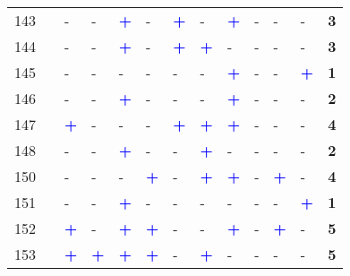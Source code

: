 \begin{longtable}{p{0.5cm}p{4.6cm}p{0.3cm}p{0.3cm}p{0.3cm}p{0.3cm}p{0.3cm}p{0.3cm}p{0.3cm}p{0.3cm}p{0.3cm}p{0.3cm}p{1cm}}
    \small{143} & \small{\textcite{meng_influence_2016}}\index{Meng, Meng|pagebf} & - & - & \textcolor{blue}{\textbf{+}} & - & \textcolor{blue}{\textbf{+}} & - & \textcolor{blue}{\textbf{+}} & - & - & - & \textbf{3}\\
    \small{144} & \small{\textcite{midenet_modal_2018}}\index{Midenet, Sophie|pagebf} & - & - & \textcolor{blue}{\textbf{+}} & - & \textcolor{blue}{\textbf{+}} & \textcolor{blue}{\textbf{+}} & - & - & - & - & \textbf{3}\\
    \small{145} & \small{\textcite{mohammadian_analyzing_2022}}\index{Mohammadian, Abolfazl|pagebf} & - & - & - & - & - & - & \textcolor{blue}{\textbf{+}} & - & - & \textcolor{blue}{\textbf{+}} & \textbf{1}\\
    \small{146} & \small{\textcite{mohanty_effect_2017}}\index{Mohanty, Sudatta|pagebf} & - & - & \textcolor{blue}{\textbf{+}} & - & - & - & \textcolor{blue}{\textbf{+}} & - & - & - & \textbf{2}\\
    \small{147} & \small{\textcite{moinse_intermodal_2022}}\index{Moinse, Dylan|pagebf} & \textcolor{blue}{\textbf{+}} & - & - & - & \textcolor{blue}{\textbf{+}} & \textcolor{blue}{\textbf{+}} & \textcolor{blue}{\textbf{+}} & - & - & - & \textbf{4}\\
    \small{148} & \small{\textcite{molin_bicycle_2015}}\index{Molin, Eric|pagebf} & - & - & \textcolor{blue}{\textbf{+}} & - & - & \textcolor{blue}{\textbf{+}} & - & - & - & - & \textbf{2}\\
    \small{150} & \small{\textcite{montes_shared_2023}}\index{Montes, Alejandro|pagebf} & - & - & - & \textcolor{blue}{\textbf{+}} & - & \textcolor{blue}{\textbf{+}} & \textcolor{blue}{\textbf{+}} & - & \textcolor{blue}{\textbf{+}} & - & \textbf{4}\\
    \small{151} & \small{\textcite{nam_designing_2018}}\index{Nam, Daisik|pagebf}\index{Nam, Daisik|pagebf} & - & - & \textcolor{blue}{\textbf{+}} & - & - & - & - & - & - & \textcolor{blue}{\textbf{+}} & \textbf{1}\\
    \small{152} & \small{\textcite{ni_exploring_2020}}\index{Ni, Ying|pagebf} & \textcolor{blue}{\textbf{+}} & - & \textcolor{blue}{\textbf{+}} & \textcolor{blue}{\textbf{+}} & - & - & \textcolor{blue}{\textbf{+}} & - & \textcolor{blue}{\textbf{+}} & - & \textbf{5}\\
    \small{153} & \small{\textcite{nielsen_bikeability_2018}}\index{Nielsen, Thomas Alexander Sick|pagebf} & \textcolor{blue}{\textbf{+}} & \textcolor{blue}{\textbf{+}} & \textcolor{blue}{\textbf{+}} & \textcolor{blue}{\textbf{+}} & - & \textcolor{blue}{\textbf{+}} & - & - & - & - & \textbf{5}\\

\end{longtable}
